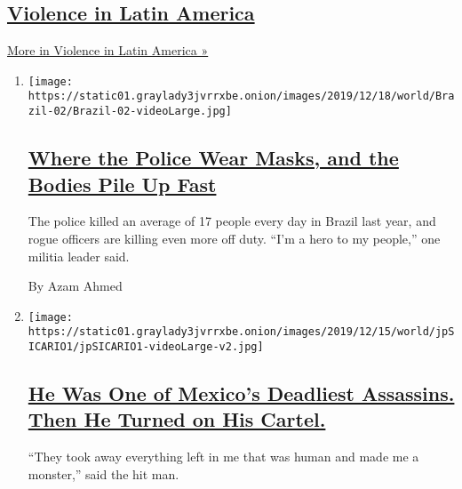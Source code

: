 \hypertarget{violence-in-latin-america}{%
\subsection{\texorpdfstring{\href{/spotlight/violence-in-latin-america}{Violence
in Latin
America}}{Violence in Latin America}}\label{violence-in-latin-america}}

\href{/spotlight/violence-in-latin-america}{More in Violence in Latin
America »}

\begin{enumerate}
\def\labelenumi{\arabic{enumi}.}
\item
  \texttt{[image: https://static01.graylady3jvrrxbe.onion/images/2019/12/18/world/Brazil-02/Brazil-02-videoLarge.jpg]}

  \hypertarget{where-the-police-wear-masks-and-the-bodies-pile-up-fast}{%
  \subsection{\texorpdfstring{\href{/2019/12/20/world/americas/brazil-police-shootings-murder.html}{Where
  the Police Wear Masks, and the Bodies Pile Up
  Fast}}{Where the Police Wear Masks, and the Bodies Pile Up Fast}}\label{where-the-police-wear-masks-and-the-bodies-pile-up-fast}}

  The police killed an average of 17 people every day in Brazil last
  year, and rogue officers are killing even more off duty. ``I'm a hero
  to my people,'' one militia leader said.

  By Azam Ahmed
\item
  \texttt{[image: https://static01.graylady3jvrrxbe.onion/images/2019/12/15/world/jpSICARIO1/jpSICARIO1-videoLarge-v2.jpg]}

  \hypertarget{he-was-one-of-mexicos-deadliest-assassins-then-he-turned-on-his-cartel}{%
  \subsection{\texorpdfstring{\href{/2019/12/14/world/americas/sicario-mexico-drug-cartels.html}{He
  Was One of Mexico's Deadliest Assassins. Then He Turned on His
  Cartel.}}{He Was One of Mexico's Deadliest Assassins. Then He Turned on His Cartel.}}\label{he-was-one-of-mexicos-deadliest-assassins-then-he-turned-on-his-cartel}}

  ``They took away everything left in me that was human and made me a
  monster,'' said the hit man.


\end{enumerate}
